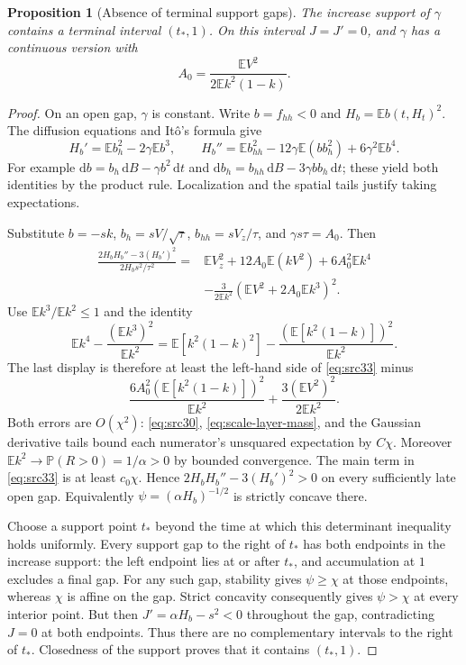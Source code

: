 \documentclass[11pt,a4paper]{article}
\numberwithin{equation}{section}
\newtheorem{proposition}[theorem]{Proposition}
\theoremstyle{definition}
\theoremstyle{remark}
\newcommand{\E}{\mathbb E}
\newcommand{\Prob}{\mathbb P}
\newcommand{\dd}{\mathrm d}
\begin{document}
\begin{proposition}[Absence of terminal support gaps]\label{prop:scale-full-support}
The increase support of $\gamma$ contains a terminal interval $(t_*,1)$.
On this interval $J=J'=0$, and $\gamma$ has a continuous version with
\begin{equation}\label{eq:src34}
 A_0=\frac{\E V^2}{2\E k^2(1-k)}.
\end{equation}
\end{proposition}
\begin{proof}
On an open gap, $\gamma$ is constant. Write $b=f_{hh}<0$ and
$H_b=\E b(t,H_t)^2$. The diffusion equations and It\^o's formula give
\[
 H_b'=\E b_h^2-2\gamma\E b^3,\qquad
 H_b''=\E b_{hh}^2-12\gamma\E(b b_h^2)+6\gamma^2\E b^4.
\]
For example $\dd b=b_h\,\dd B-\gamma b^2\,\dd t$ and
$\dd b_h=b_{hh}\,\dd B-3\gamma b b_h\,\dd t$; these yield both
identities by the product rule. Localization and the spatial tails
justify taking expectations.

Substitute $b=-sk$, $b_h=sV/\sqrt\tau$,
$b_{hh}=sV_z/\tau$, and $\gamma s\tau=A_0$. Then
\begin{align*}
 \frac{2H_bH_b''-3(H_b')^2}{2H_bs^2/\tau^2}
 ={}&\E V_z^2+12A_0\E(kV^2)+6A_0^2\E k^4\\
 &-\frac{3}{2\E k^2}(\E V^2+2A_0\E k^3)^2.
\end{align*}
Use $\E k^3/\E k^2\le1$ and the identity
\[
 \E k^4-\frac{(\E k^3)^2}{\E k^2}
 =\E[k^2(1-k)^2]-\frac{(\E[k^2(1-k)])^2}{\E k^2}.
\]
The last display is therefore at least the left-hand side of
\eqref{eq:src33} minus
\[
 \frac{6A_0^2(\E[k^2(1-k)])^2}{\E k^2}
 +\frac{3(\E V^2)^2}{2\E k^2}.
\]
Both errors are $O(\chi^2)$: \eqref{eq:src30},
\eqref{eq:scale-layer-mass}, and the Gaussian derivative tails bound
each numerator's unsquared expectation by $C\chi$.
Moreover $\E k^2\to\Prob(R>0)=1/\alpha>0$ by bounded convergence.
The main term in \eqref{eq:src33} is at least $c_0\chi$.
Hence $2H_bH_b''-3(H_b')^2>0$ on every sufficiently late open gap.
Equivalently $\psi=(\alpha H_b)^{-1/2}$ is strictly concave there.

Choose a support point $t_*$ beyond the time at which this determinant
inequality holds uniformly. Every support gap to the right of $t_*$
has both endpoints in the increase support: the left endpoint lies
at or after $t_*$, and accumulation at $1$ excludes a final gap.
For any such gap,
stability gives $\psi\ge\chi$ at those endpoints, whereas $\chi$ is
affine on the gap. Strict concavity consequently gives $\psi>\chi$
at every interior point. But then
$J'=\alpha H_b-s^2<0$ throughout the gap, contradicting $J=0$ at
both endpoints. Thus there are no complementary intervals to the
right of $t_*$. Closedness of the support proves that it contains
$(t_*,1)$.


\end{proof}
\end{document}
